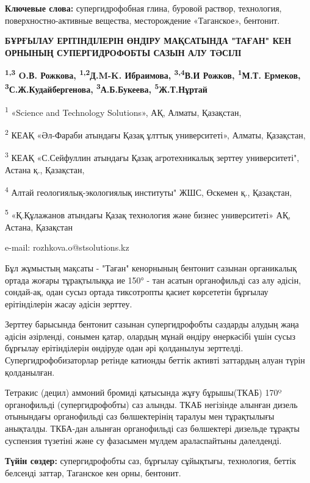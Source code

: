 {\bfseries Ключевые слова:} супергидрофобная глина, буровой раствор,
технология, поверхностно-активные вещества, месторождение «Таганское»,
бентонит.

\begin{center}
{\large\bfseries БҰРҒЫЛАУ ЕРІТІНДІЛЕРІН ӨНДІРУ МАҚСАТЫНДА "ТАҒАН" КЕН ОРНЫНЫҢ СУПЕРГИДРОФОБТЫ САЗЫН АЛУ ТӘСІЛІ}

{\bfseries \textsuperscript{1,3} O.В. Рожкова\envelope, \textsuperscript{1,2}Д.M-K.
Ибраимова, \textsuperscript{3,4}В.И Рожков, \textsuperscript{1}М.Т.
Ермеков, \textsuperscript{3}С.Ж.Кудайбергенова,
\textsuperscript{3}А.Б.Букеева, \textsuperscript{5}Ж.Т.Нұртай}

\textsuperscript{1} «Science and Technology Solutions», АҚ, Алматы,
Қазақстан,

\textsuperscript{2} КЕАҚ «Әл-Фараби атындағы Қазақ ұлттық университеті»,
Алматы, Қазақстан,

\textsuperscript{3} КЕАҚ «С.Сейфуллин атындағы Қазақ агротехникалық
зерттеу университеті", Астана қ., Қазақстан,

\textsuperscript{4} Алтай геологиялық-экологиялық институты" ЖШС,
Өскемен қ., Қазақстан,

\textsuperscript{5} «Қ.Құлажанов атындағы Қазақ технология және бизнес
университеті» АҚ, Астана, Қазақстан

e-mail: rozhkova.o@stsolutions.kz
\end{center}

Бұл жұмыстың мақсаты - "Таған" кенорнының бентонит сазынан органикалық
ортада жоғары тұрақтылыққа ие 150° - тан асатын органофильді саз алу
әдісін, сондай-ақ, одан сусыз ортада тиксотропты қасиет көрсететін
бұрғылау ерітінділерін жасау әдісін зерттеу.

Зерттеу барысында бентонит сазынан супергидрофобты саздарды алудың жаңа
әдісін әзірленді, сонымен қатар, олардың мұнай өндіру өнеркәсібі үшін
сусыз бұрғылау ерітінділерін өндіруде одан әрі қолданылуы зерттелді.
Супергидрофобизаторлар ретінде катионды беттік активті заттардың алуан
түрін қолданылған.

Тетракис (децил) аммоний бромиді қатысында жұғу бұрышы(ТКАБ) 170º
органофильді (супергидрофобты) саз алынды. ТКАБ негізінде алынған дизель
отынындағы органофильді саз бөлшектерінің таралуы мен тұрақтылығы
анықталды. ТКБА-дан алынған органофильді саз бөлшектері дизельде тұрақты
суспензия түзетіні және су фазасымен мүлдем араласпайтыны дәлелденді.

{\bfseries Түйін сөздер:} супергидрофобты саз, бұрғылау сұйықтығы,
технология, беттік белсенді заттар, Таганское кен орны, бентонит.

